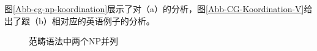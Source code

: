 \begin{exe}
\begin{xlist}[iv.]
\begin{exe}
\begin{xlist}[iv.]
{}
图\vref{Abb-cg-np-koordination}展示了对（a）的分析，图\vref{Abb-CG-Koordination-V}给出了跟（b）相对应的英语例子的分析。
\begin{figure}
\centerline{%
}
\caption{\label{Abb-cg-np-koordination}范畴语法中两个NP并列}
\end{figure}%


\end{xlist}
\end{exe}
\end{xlist}
\end{exe}
